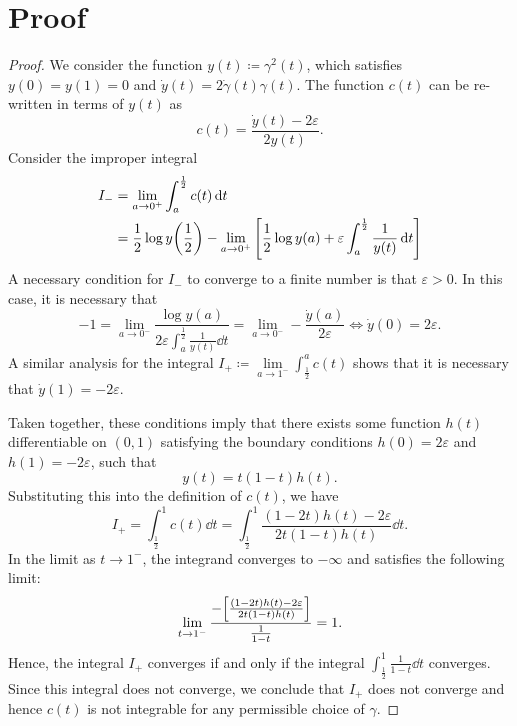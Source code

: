 \section{Proof }\label{prf:lem:ni}
\restatelemni*

\begin{proof}
  We consider the function \(y(t) \coloneqq \gamma^{2}(t)\), which satisfies \(y(0) =y(1) = 0\) and \(\dot{y}(t) = 2 \dot{\gamma}(t) \gamma(t)\). The function \(c(t)\) can be re-written in terms of \(y(t)\) as
  \[
    c(t) = \frac{ \dot{y}(t) - 2\varepsilon}{2y(t)}.
  \]
  Consider the improper integral
  \begin{align*}
    I_{-} &= \lim\limits_{a \to 0^{+}} \int_{a}^{\frac{1}{2}} c(t) \dd{t} \\
    &= \frac{1}{2} \log y\qty(\frac{1}{2}) - \lim\limits_{a \to 0^{+}} \qty[\frac{1}{2} \log y(a) + \varepsilon \int_{a}^{\frac{1}{2}} \frac{1}{y(t)} \dd{t}]
  \end{align*}
  A necessary condition for \(I_{-}\) to converge to a finite number is that \(\varepsilon > 0\). In this case, it is necessary that
  \[
    -1 = \lim\limits_{a \to 0^{-}} \frac{\log y(a)}{2 \varepsilon \int_{a}^{\frac{1}{2}} \frac{1}{y(t)} \dd{t}} = \lim\limits_{a \to 0^{-}} -\frac{\dot{y}(a)}{ 2 \varepsilon} \iff \dot{y}(0) = 2\varepsilon.
  \]
  A similar analysis for the integral \(I_{+} \coloneqq \lim\limits_{a \to 1^{-}} \int_{\frac{1}{2}}^{a} c(t)\) shows that it is necessary that \(\dot{y}(1) = -2\varepsilon\).

  Taken together, these conditions imply that there exists some function \(h(t)\) differentiable on \((0, 1)\) satisfying the boundary conditions \(h(0) = 2\varepsilon\) and \(h(1) = -2\varepsilon\), such that
  \[
    y(t) =  t(1-t) h(t).
  \]
  Substituting this into the definition of \(c(t)\), we have
  \[
    I_{+} = \int_{\frac{1}{2}}^{1} c(t)\dd{t}= \int_{\frac{1}{2}}^{1} \frac{(1 - 2t) h(t) - 2\varepsilon}{2t(1-t) h(t)}\dd{t}.
  \]
  In the limit as \(t \to 1^{-}\), the integrand converges to \(-\infty\) and satisfies the following limit:
  \[
    \lim\limits_{t \to 1^{-}}  \frac{-\qty[\frac{(1-2t) h(t) - 2\varepsilon}{2t(1-t) h(t)}]}{\frac{1}{1-t}} = 1.
  \]
  Hence, the integral \(I_{+}\) converges if and only if the integral \(\int_{\frac{1}{2}}^{1} \frac{1}{1-t} \dd{t}\) converges. Since this integral does not converge, we conclude that \(I_{+}\) does not converge and hence \(c(t)\) is not integrable for any permissible choice of \(\gamma\).
\end{proof}

